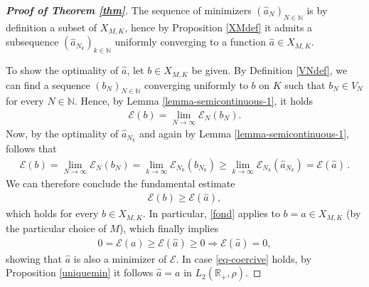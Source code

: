 \documentclass[A4paper,11pt]{article}
\theoremstyle{definition}
\newcommand{\N}{\mathbb{N}}
\newcommand{\R}{\mathbb{R}}
\begin{document}
\begin{proof}[\normalfont\bf Proof of Theorem \ref{thm}]
	The sequence of minimizers $(\widehat a_N)_{N \in \N}$ is by definition a subset of $X_{M,K}$, hence by Proposition \ref{XMdef} it admits a subsequence $(\widehat a_{N_k})_{k \in \N}$ uniformly converging to a function $\widehat a \in X_{M,K}$.
	
	To show the optimality of $\widehat a$, let $b\in X_{M,K}$ be given. By Definition \ref{VNdef}, we can find a sequence $(b_N)_{N \in \N}$ converging uniformly to $b$ on $K$ such that $b_N\in V_N$ for every $N\in \N$. Hence, by Lemma \ref{lemma-semicontinuous-1}, it holds
	\begin{align*}
		\mathcal E(b)=\lim_{N\rightarrow\infty} \mathcal E_{N}(b_{N}).
	\end{align*}
	Now, by the optimality of $\widehat a_{N_k}$ and again by Lemma \ref{lemma-semicontinuous-1}, follows that
	\begin{align*}
		\mathcal E(b)=\lim_{N\rightarrow\infty}\mathcal E_N(b_N)
			= \lim_{k \rightarrow\infty}\mathcal E_{N_k}(b_{N_k})
			\geq\lim_{k \rightarrow\infty}\mathcal E_{N_k}(\widehat a_{N_k})
			= \mathcal E(\widehat a)\,.
	\end{align*}
	We can therefore conclude the fundamental estimate
	\begin{align}\label{fond}
		\mathcal E(b)\geq \mathcal E(\widehat a),
	\end{align}
	which holds for every $b \in X_{M,K}$. In particular, \eqref{fond} applies to $b=a\in X_{M,K}$ (by the particular choice of $M$), which finally implies
	\begin{align*}
		0=\mathcal E(a)\geq \mathcal E(\widehat a)\geq 0\Longrightarrow \mathcal  E(\widehat a)=0,
	\end{align*}
	showing that $\widehat a$ is also a minimizer of $\mathcal E$. In case \eqref{eq-coercive} holds, by Proposition \ref{uniquemin} it follows $\widehat a=a$ in  $L_2(\R_+,\rho)$.
\end{proof}
\end{document}
